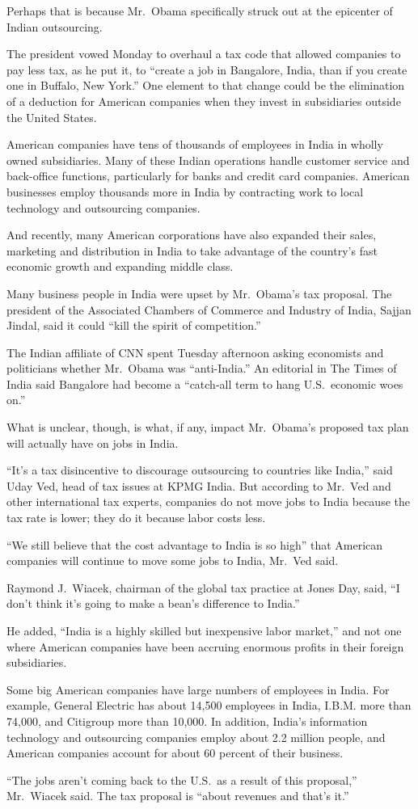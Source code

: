 \documentclass[12pt,a4paper,onecolumn]{article}
\begin{document}
Perhaps that is because Mr.~Obama specifically struck out at the epicenter of Indian outsourcing.

The president vowed Monday to overhaul a tax code that allowed companies to pay less tax, as he put
it, to ``create a job in Bangalore, India, than if you create one in Buffalo, New York.'' One
element to that change could be the elimination of a deduction for American companies when they
invest in subsidiaries outside the United States.

American companies have tens of thousands of employees in India in wholly owned subsidiaries. Many
of these Indian operations handle customer service and back-office functions, particularly for banks
and credit card companies. American businesses employ thousands more in India by contracting work to
local technology and outsourcing companies.

And recently, many American corporations have also expanded their sales, marketing and distribution
in India to take advantage of the country's fast economic growth and expanding middle class.

Many business people in India were upset by Mr.~Obama's tax proposal. The president of the
Associated Chambers of Commerce and Industry of India, Sajjan Jindal, said it could ``kill the
spirit of competition.''

The Indian affiliate of CNN spent Tuesday afternoon asking economists and politicians whether
Mr.~Obama was ``anti-India.'' An editorial in The Times of India said Bangalore had become a
``catch-all term to hang U.S.~economic woes on.''

What is unclear, though, is what, if any, impact Mr.~Obama's proposed tax plan will actually have on
jobs in India.

``It's a tax disincentive to discourage outsourcing to countries like India,'' said Uday Ved, head
of tax issues at KPMG India. But according to Mr.~Ved and other international tax experts, companies
do not move jobs to India because the tax rate is lower; they do it because labor costs less.

``We still believe that the cost advantage to India is so high'' that American companies will
continue to move some jobs to India, Mr.~Ved said.

Raymond J.~Wiacek, chairman of the global tax practice at Jones Day, said, ``I don't think it's
going to make a bean's difference to India.''

He added, ``India is a highly skilled but inexpensive labor market,'' and not one where American
companies have been accruing enormous profits in their foreign subsidiaries.

Some big American companies have large numbers of employees in India. For example, General Electric
has about 14,500 employees in India, I.B.M. more than 74,000, and Citigroup more than 10,000. In
addition, India's information technology and outsourcing companies employ about 2.2 million people,
and American companies account for about 60 percent of their business.

``The jobs aren't coming back to the U.S.~as a result of this proposal,'' Mr.~Wiacek said. The tax
proposal is ``about revenues and that's it.''

\pagebreak
\printindex
\end{document}
